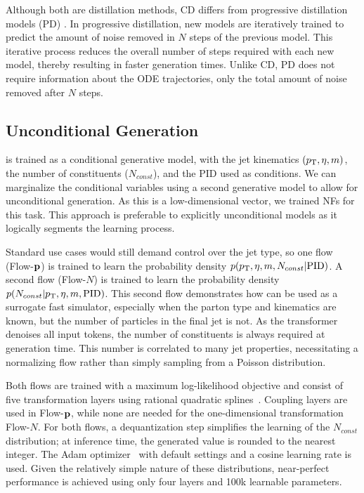 Although both are distillation methods, CD differs from progressive distillation models (PD) \cite{ProgressiveDistillationFast}.
In progressive distillation, new models are iteratively trained to predict the amount of noise removed in $N$ steps of the previous model.
This iterative process reduces the overall number of steps required with each new model, thereby resulting in faster generation times.
Unlike CD, PD does not require information about the ODE trajectories, only the total amount of noise removed after $N$ steps.

\subsection{Unconditional Generation}

\pcdroid is trained as a conditional generative model, with the jet kinematics $(p_\mathrm{T}, \eta, m)$, the number of constituents ($N_{const}$), and the PID used as conditions.
We can marginalize the conditional variables using a second generative model to allow for unconditional generation.
As this is a low-dimensional vector, we trained NFs for this task.
This approach is preferable to explicitly unconditional models as it logically segments the learning process.

Standard use cases would still demand control over the jet type, so
one flow (Flow-$\mathbf{p}$) is trained to learn the probability density $p(p_\mathrm{T}, \eta, m, N_{const} |\textrm{PID})$.
A second flow (Flow-$N$) is trained to learn the probability density $ p(N_{const}|p_\mathrm{T}, \eta, m, \textrm{PID}) $.
This second flow demonstrates how \pcdroid can be used as a surrogate fast simulator, especially when the parton type and kinematics are known, but the number of particles in the final jet is not.
As the transformer denoises all input tokens, the number of constituents is always required at generation time.
This number is correlated to many jet properties, necessitating a normalizing flow rather than simply sampling from a Poisson distribution.

Both flows are trained with a maximum log-likelihood objective and consist of five transformation layers using rational quadratic splines~\cite{NeuralSplineFlows}.
Coupling layers are used in Flow-$\mathbf{p}$, while none are needed for the one-dimensional transformation Flow-$N$.
For both flows, a dequantization step simplifies the learning of the $N_{const}$ distribution; at inference time, the generated value is rounded to the nearest integer.
The Adam optimizer~\cite{Adam} with default settings and a cosine learning rate is used.
Given the relatively simple nature of these distributions, near-perfect performance is achieved using only four layers and 100k learnable parameters.

